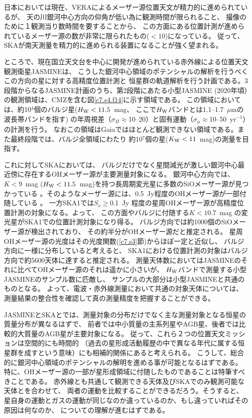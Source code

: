 日本においては現在、VERAによるメーザー源位置天文が精力的に進められているが、
天の川銀河中心方向の仰角が低い為に観測時間が限られること、
撮像のために１観測当り数時間を要することから、
この方面にある位置計測が進められているメーザー源の数が非常に限られたもの($<10$)になっている。
従って、SKAが南天測量を精力的に進められる装置になることが強く望まれる。

ところで、現在国立天文台を中心に開発が進められている赤外線による位置天文観測衛星JASMINEは、
こうした銀河中心領域のポテンシャルの解析を行うべくこの方向の星に対する高精度位置計測と
恒星群の軌道解析を行う計画である。3段階からなるJASMINE計画のうち、第2段階にあたる小型JASMINE
(2020年頃）の観測領域は、CMZを含む図\ref{c7.s4.f14}に示す領域である。
この領域においては、約10$^{4}$個のバルジ星($H_{\rm W}<11.5$~mag、
ここで$H_{\rm W}$バンドとは1.1--1.7~$\mu$mの波長帯バンドを指す)
の年周視差（$\sigma_{\Pi}\approx$10--20\uas ）と固有運動（$\sigma_{\mu}\approx$10--50\uas ~yr$^{-1}$）の計測を行う。
なおこの領域はGaiaではほとんど観測できない領域である。また最終段階では、バルジ全領域にわたり
約10$^{7}$個の星($K_{\rm W}<11$~mag)の測量を目指す。

これに対してSKAにおいては、
バルジだけでなく星間減光が激しい銀河中心最近傍に存在するOHメーザー源が主要測量対象になる。
銀河中心方向では、$K<9$~mag ($H_{\rm W}<11.5$~mag)を持つ長周期変光星に多数のSiOメーザー源が見つかっている
 \citep{2004PASJ...56..765D}。そのようなメーザー源には、0.5~Jy程度のOHメーザー源が一部付随している
 \citep{1998A&AS..128...35S, 1998A&A...329..991B}。
一方SKA1では$S_{\nu}\geq$0.1~Jy 程度の星周OHメーザー源が高精度位置計測の対象になる。よって、
この方面やバルジに付随する$K<10.7$~mag の変光星がSKA1での位置計測対象になり得る。
バルジ方向では約1000個のSiOメーザー源が検出されており\citep{2007IAUS..242..200D}、
その約半分がOHメーザー源だと推定される\citep{2002PASJ...54L..19I}。
星周OHメーザー源の光度はその光度関数(\ref{c7.s3}節)からほぼ一定と近似し、
バルジ方向に一様に分布していると考えると、
SKA1における位置計測の対象はバルジ方向で約5600天体に達すると推定される。
測量天体数においてはJASMINEのそれに比べてOHメーザー源のそれは遥かに小さいが、
$H_{\rm W}$バンドで測量する小型JASMINEのサンプル数に匹敵し、
サンプルの大部分は小型JASMINEと共通のものとなる。
よって、電波・赤外線測量において共通の対象天体については、
測量結果の整合性を確認して真の測量精度を把握することができる。

JASMINEとSKAとでは、測量対象の分布だけでなく主な測量対象となる恒星の質量分布が異なるはずで、
前者では中小質量の主系列星やAGB星、後者では比較的大質量のAGB星が主要対象になる。
従って、これら２つの位置天文ミッションは空間的にも時間的
（過去の星形成活動履歴の中で異なる年代に属する恒星群を成すという意味）にも相補的関係にあると考えられる。
こうして、総合的に銀河中心領域のポテンシャルの解明を進める事が可能となるはずである。
特に、OHメーザー源の一部が星形成領域に付随したものであることは特筆すべきことである。
赤外線とも共通して観測できる天体及びSKAでのみ観測可能な天体とを合わせて、
両者の運動を比較することができるだろう。そうすると、
星自身の運動とガスの運動が同じなのか違っているのか、もし違っていればその原因は何なのか、
についての理解が進むはずである。

